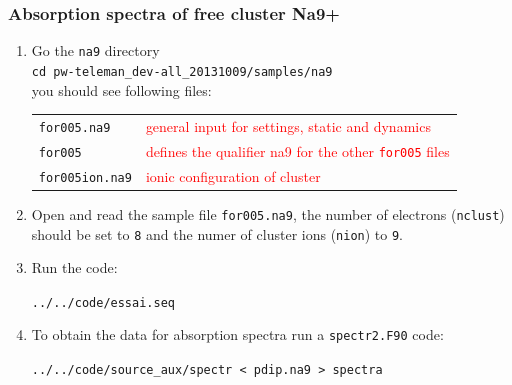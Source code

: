 \documentclass[10pt]{beamer}
\begin{document}

\begin{frame}
\frametitle{Absorption spectra of free cluster Na9+}
\begin{enumerate}
\item Go the {\tt na9} directory\\
\vspace*{0.2cm}
{\tt cd pw-teleman\_dev-all\_20131009/samples/na9}\\
\vspace*{0.2cm}
you should see following files:\\
\vspace*{0.2cm}
\begin{tabular}{ll}
{\tt for005.na9} &{\scriptsize{\textcolor{red}{general input for settings, static and dynamics}}}\\
{\tt for005}  &{\scriptsize{\textcolor{red}{defines the qualifier na9 for the other {\tt for005} files}}}\\
{\tt for005ion.na9}  &{\scriptsize{\textcolor{red}{ionic configuration of cluster}}}\\
\end{tabular}
\vspace*{0.4cm}


\item Open and read the sample file {\tt for005.na9}, the number of electrons ({\tt nclust}) should be set to {\tt 8} and the numer of cluster ions ({\tt nion}) to {\tt 9}. 

\item Run the code:

{\tt ../../code/essai.seq}

\item To obtain the data for absorption spectra run a {\tt spectr2.F90} code:

\small{{\tt ../../code/source\_aux/spectr < pdip.na9 > spectra}}
\end{enumerate}

\end{frame}
\end{document}
